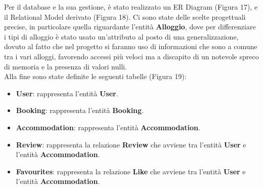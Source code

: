 \documentclass[10pt]{article}
\begin{document}
Per il database e la sua gestione, è stato realizzato un ER Diagram (Figura 17), e il Relational Model derivato (Figura 18). Ci sono state delle scelte progettuali precise, in particolare quella riguardante l'entità \textbf{Alloggio}, dove per differenziare i tipi di alloggio è stato usato un'attributo al posto di una generalizzazione, dovuto al fatto che nel progetto si faranno uso di informazioni che sono a comune tra i vari alloggi, favorendo accessi più veloci ma a discapito di un notevole spreco di memoria e la presenza di valori nulli.\\
Alla fine sono state definite le seguenti tabelle (Figura 19):
\begin{itemize}
\item \textbf{User}: rappresenta l'entità \textbf{User}.
\item \textbf{Booking}: rappresenta l'entità \textbf{Booking}.
\item \textbf{Accommodation}: rappresenta l'entità \textbf{Accommodation}.
\item \textbf{Review}: rappresenta la relazione \textbf{Review} che avviene tra l'entità \textbf{User} e l'entità \textbf{Accommodation}.
\item \textbf{Favourites}: rappresenta la relazione \textbf{Like} che avviene tra l'entità \textbf{User} e l'entità \textbf{Accommodation}.
\end{itemize}
\end{document}
